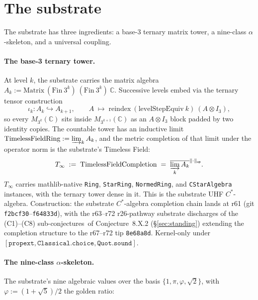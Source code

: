 \documentclass[11pt,a4paper]{amsart}
\theoremstyle{plain}
\theoremstyle{definition}
\begin{document}
\section{The substrate}\label{sec:substrate}

The substrate has three ingredients: a base-3 ternary matrix tower, a nine-class $\alpha$-skeleton, and a universal coupling.

\paragraph{The base-3 ternary tower.} At level $k$, the substrate carries the matrix algebra $A_k := \mathrm{Matrix}~(\mathrm{Fin}~3^k)~(\mathrm{Fin}~3^k)~\mathbb{C}$. Successive levels embed via the ternary tensor construction
\[
\iota_k \colon A_k \hookrightarrow A_{k+1}, \qquad A \;\longmapsto\; \mathrm{reindex}~(\mathrm{levelStepEquiv}~k)~(A \otimes I_3),
\]
so every $M_{3^k}(\mathbb{C})$ sits inside $M_{3^{k+1}}(\mathbb{C})$ as an $A \otimes I_3$ block padded by two identity copies. The countable tower has an inductive limit $\mathrm{TimelessFieldRing} := \varinjlim_k A_k$, and the metric completion of that limit under the operator norm is the substrate's Timeless Field:
\[
T_\infty \;:=\; \mathrm{TimelessFieldCompletion} \;=\; \overline{\varinjlim_k A_k}^{\|\cdot\|_{\textsf{op}}}.
\]
$T_\infty$ carries mathlib-native \texttt{Ring}, \texttt{StarRing}, \texttt{NormedRing}, and \texttt{CStarAlgebra} instances, with the ternary tower dense in it. This is the substrate UHF $C^*$-algebra. Construction: the substrate $C^*$-algebra completion chain lands at r61 (git \texttt{f2bcf30}--\texttt{f64833d}), with the r63--r72 r26-pathway substrate discharges of the (C1)--(C8) sub-conjectures~of Conjecture~8.X.2 (\S\ref{sec:standing}) extending the completion structure to the r67--r72 tip \texttt{8e68a8d}. Kernel-only under $[\texttt{propext}, \texttt{Classical.choice}, \texttt{Quot.sound}]$.

\paragraph{The nine-class $\alpha$-skeleton.} The substrate's nine algebraic values over the basis $\{1, \pi, \varphi, \sqrt{2}\}$, with $\varphi := (1+\sqrt{5})/2$ the golden ratio:
\end{document}
